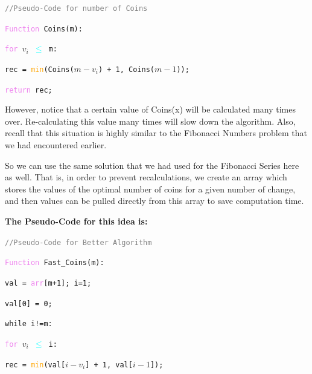 \documentclass{article}
\theoremstyle{definition}
\theoremstyle{example}
\begin{document}
\noindent \texttt{\textcolor{gray}{//Pseudo-Code for number of Coins}} \par
\noindent \texttt{\textcolor{violet}{Function} Coins(m):} \par
\noindent \hspace{10mm} \texttt{\textcolor{violet}{for} $v_i$ \textcolor{cyan}{$\leq$} m:} \par
\noindent \hspace{20mm} \texttt{rec = \textcolor{orange}{min}(Coins($m-v_i$) + 1, Coins($m-1$));} \par
\noindent \hspace{10mm} \texttt{\textcolor{violet}{return} rec;}\par
\vspace{4mm}
However, notice that a certain value of Coins(x) will be calculated many times over. Re-calculating this value many times will slow down the algorithm. Also, recall that this situation is highly similar to the Fibonacci Numbers problem that we had encountered earlier.\par
\vspace{4mm}
So we can use the same solution that we had used for the Fibonacci Series here as well. That is, in order to prevent recalculations, we create an array which stores the values of the optimal number of coins for a given number of change, and then values can be pulled directly from this array to save computation time.\par
\vspace{5mm}
\noindent\textbf{The Pseudo-Code for this idea is:}\par
\vspace{3mm}
\noindent\texttt{\textcolor{gray}{//Pseudo-Code for Better Algorithm}}\par
\noindent\texttt{\textcolor{violet}{Function} Fast\_Coins(m):} \par
\noindent\hspace{10mm} \texttt{val = \textcolor{violet}{arr}[m+1]; i=1;}\par
\noindent \hspace{10mm} \texttt{val[0] = 0;} \par
\noindent\hspace{10mm} \texttt{while i!=m:}\par
\noindent \hspace{20mm} \texttt{\textcolor{violet}{for} $v_i$ \textcolor{cyan}{$\leq$} i:} \par
\noindent \hspace{30mm} \texttt{rec = \textcolor{orange}{min}(val[$i-v_i$] + 1, val[$i-1$]);} \par
\end{document}
